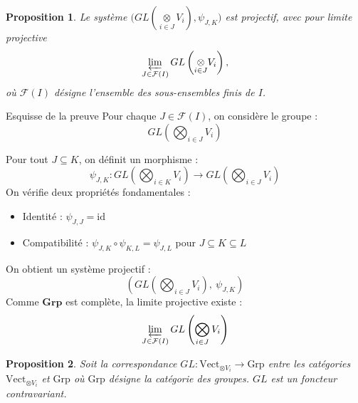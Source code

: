 \documentclass[9pt]{beamer}
\newtheorem{proposition}{Proposition}
\begin{document}
\begin{frame}
\begin{proposition}\label{prop2}
Le système $\big(GL(\underset{i \in J}{\otimes} V_i), \psi_{J,K} \big)$ est projectif, avec pour limite projective
	\[
	\varprojlim_{J \in \mathcal{F}(I)} GL\left(\underset{i \in J}{\otimes} V_i\right),
	\]
	où $\mathcal{F}(I)$ désigne l’ensemble des sous-ensembles finis de $I$.
\end{proposition}

\end{frame}


\begin{frame}{Esquisse de la preuve}
	Pour chaque \( J \in \mathcal{F}(I) \), on considère le groupe :
	\[
	GL\left( \bigotimes_{i \in J} V_i \right)
	\]
	

	Pour tout \( J \subseteq K \), on définit un morphisme :
	\[
	\psi_{J,K} :
	GL\left( \bigotimes_{i \in K} V_i \right)
	\longrightarrow
	GL\left( \bigotimes_{i \in J} V_i \right)
	\]
On vérifie deux propriétés fondamentales :
	\begin{itemize}
		\item Identité : \( \psi_{J,J} = \mathrm{id} \)
		\item Compatibilité : \( \psi_{J,K} \circ \psi_{K,L} = \psi_{J,L} \) pour \( J \subseteq K \subseteq L \)
	\end{itemize}
	
	On obtient un système projectif :
	\[
	\left( GL\left( \bigotimes_{i \in J} V_i \right),\ \psi_{J,K} \right)
	\]	
Comme \( \mathbf{Grp} \) est complète, la limite projective existe :
\[
\varprojlim_{J \in \mathcal{F}(I)} GL\left( \bigotimes_{i \in J} V_i \right)
\]
\end{frame}

\begin{frame}
\begin{proposition}
	Soit la correspondance \( GL : \text{Vect}_{\otimes V_i} \rightarrow \text{Grp} \) entre les catégories 
	\( \text{Vect}_{\otimes V_i} \) et \( \text{Grp} \) où \( \text{Grp} \) désigne la catégorie des groupes. \( GL \) est un foncteur contravariant.
	
\end{proposition}
\end{frame}
\end{document}
